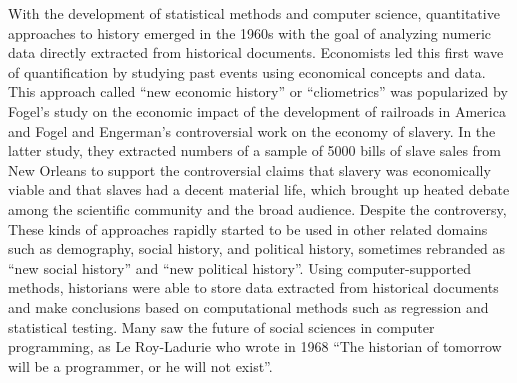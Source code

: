 With the development of statistical methods and computer science, quantitative approaches to history emerged in the 1960s with the goal of analyzing numeric data directly extracted from historical documents.
Economists led this first wave of quantification by studying past events using economical concepts and data.
This approach called ``new economic history'' or ``cliometrics'' was popularized by Fogel's study on the economic impact of the development of railroads in America\cite{fogelRailroadsAmericanEconomic1970} and Fogel and Engerman's controversial work on the economy of slavery\cite{fogel1974time}.
In the latter study, they extracted numbers of a sample of 5000 bills of slave sales from New Orleans to support the controversial claims that slavery was economically viable and that slaves had a decent material life, which brought up heated debate among the scientific community and the broad audience\cite{whaplesWhereThereConsensus1995}.
Despite the controversy, These kinds of approaches rapidly started to be used in other related domains such as demography, social history, and political history, sometimes rebranded as ``new social history'' and ``new political history''\cite{lemercierBackSourcesPracticing2021}.
Using computer-supported methods, historians were able to store data extracted from historical documents and make conclusions based on computational methods such as regression and statistical testing.
Many saw the future of social sciences in computer programming, as Le Roy-Ladurie who wrote in 1968 ``The historian of tomorrow will be a programmer, or he will not exist''\cite{lemercierQuantitativeMethodsHumanities2019}.

